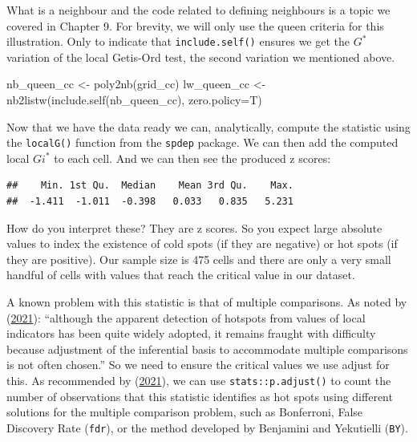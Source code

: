 \documentclass[
  krantz2]{krantz}
\makeatletter
\newenvironment{Shaded}{\begin{snugshade}}{\end{snugshade}}
\newcommand{\AttributeTok}[1]{\textcolor[rgb]{0.61,0.61,0.61}{#1}}
\newcommand{\CommentTok}[1]{\textcolor[rgb]{0.37,0.37,0.37}{\textit{#1}}}
\newcommand{\FunctionTok}[1]{\textcolor[rgb]{0,0,0}{#1}}
\newcommand{\NormalTok}[1]{#1}
\newcommand{\OtherTok}[1]{\textcolor[rgb]{0.37,0.37,0.37}{#1}}
\newcommand{\SpecialCharTok}[1]{\textcolor[rgb]{0,0,0}{#1}}
\newenvironment{kframe}{%
\medskip{}
\setlength{\fboxsep}{.8em}
 \def\at@end@of@kframe{}%
 \ifinner\ifhmode%
  \def\at@end@of@kframe{\end{minipage}}%
  \begin{minipage}{\columnwidth}%
 \fi\fi%
 \def\FrameCommand##1{\hskip\@totalleftmargin \hskip-\fboxsep
 \colorbox{shadecolor}{##1}\hskip-\fboxsep
     \hskip-\linewidth \hskip-\@totalleftmargin \hskip\columnwidth}%
 \MakeFramed {\advance\hsize-\width
   \@totalleftmargin\z@ \linewidth\hsize
   \@setminipage}}%
 {\par\unskip\endMakeFramed%
 \at@end@of@kframe}
\renewenvironment{Shaded}{\begin{kframe}}{\end{kframe}}
\makeatother
\begin{document}
What is a neighbour and the code related to defining neighbours is a topic we covered in Chapter 9. For brevity, we will only use the queen criteria for this illustration. Only to indicate that \texttt{include.self()} ensures we get the \(G^*\) variation of the local Getis-Ord test, the second variation we mentioned above.

\begin{Shaded}
\begin{Highlighting}[]
\NormalTok{nb\_queen\_cc }\OtherTok{\textless{}{-}}  \FunctionTok{poly2nb}\NormalTok{(grid\_cc)}
\NormalTok{lw\_queen\_cc }\OtherTok{\textless{}{-}} \FunctionTok{nb2listw}\NormalTok{(}\FunctionTok{include.self}\NormalTok{(nb\_queen\_cc), }\AttributeTok{zero.policy=}\NormalTok{T)}
\end{Highlighting}
\end{Shaded}

Now that we have the data ready we can, analytically, compute the statistic using the \texttt{localG()} function from the \texttt{spdep} package. We can then add the computed local \(Gi^*\) to each cell. And we can then see the produced z scores:

\begin{Shaded}
\end{Shaded}

\begin{verbatim}
##    Min. 1st Qu.  Median    Mean 3rd Qu.    Max. 
##  -1.411  -1.011  -0.398   0.033   0.835   5.231
\end{verbatim}

How do you interpret these? They are z scores. So you expect large absolute values to index the existence of cold spots (if they are negative) or hot spots (if they are positive). Our sample size is 475 cells and there are only a very small handful of cells with values that reach the critical value in our dataset.

A known problem with this statistic is that of multiple comparisons. As noted by (\protect\hyperlink{ref-Pebesma_2021}{2021}): ``although the apparent detection of hotspots from values of local indicators has been quite widely adopted, it remains fraught with difficulty because adjustment of the inferential basis to accommodate multiple comparisons is not often chosen.'' So we need to ensure the critical values we use adjust for this. As recommended by (\protect\hyperlink{ref-Pebesma_2021}{2021}), we can use \texttt{stats::p.adjust()} to count the number of observations that this statistic identifies as hot spots using different solutions for the multiple comparison problem, such as Bonferroni, False Discovery Rate (\texttt{fdr}), or the method developed by Benjamini and Yekutielli (\texttt{BY}).
\end{document}
